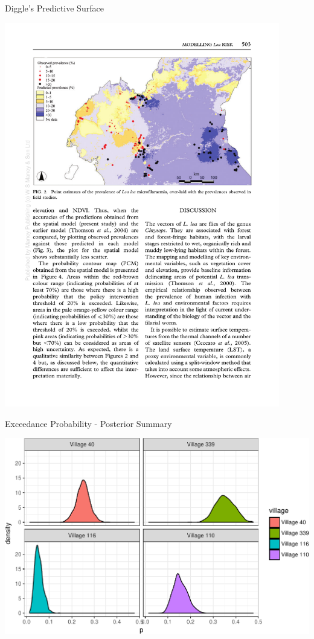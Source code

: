 \documentclass[11pt,ignorenonframetext,]{beamer}
\begin{document}
\begin{frame}{Diggle’s Predictive Surface}
\protect\hypertarget{diggles-predictive-surface}{}

\begin{center}
\includegraphics[width=0.9\textwidth]{figs/diggle_fig2.pdf}
\end{center}

\end{frame}

\begin{frame}{Exceedance Probability - Posterior Summary}
\protect\hypertarget{exceedance-probability---posterior-summary}{}

\begin{center}\includegraphics[width=\textwidth]{Lec20_files/figure-beamer/unnamed-chunk-18-1} \end{center}

\end{frame}
\end{document}
